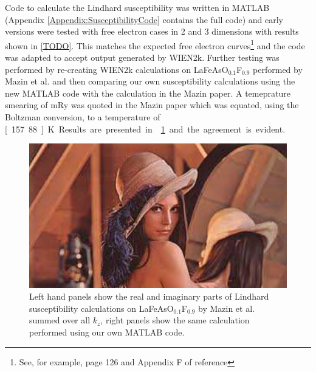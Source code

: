 Code to calculate the Lindhard susceptibility was written in MATLAB (Appendix \ref{Appendix:SusceptibilityCode} contains the full code) and early versions were tested with free electron cases in 2 and 3 dimensions with results shown in \ref{TODO}. This matches the expected free electron curves\footnote{See, for example, page 126 and Appendix F of reference\cite{Dressel2002}} and the code was adapted to accept output generated by WIEN2k. Further testing was performed by re-creating WIEN2k calculations on LaFeAsO$_{0.1}$F$_{0.9}$ performed by Mazin et al.\cite{Mazin2008} and then comparing our own susceptibility calculations using the new MATLAB code with the calculation in the Mazin paper. A temeprature smearing of \unit[1]{mRy} was quoted in the Mazin paper which was equated, using the Boltzman conversion, to a temperature of \unit[157.88]{K}. Results are presented in \fig\ref{Fig:3:MazinX0Comparison} and the agreement is evident.

\begin{figure}[htbp]
    \begin{center}
        \includegraphics[scale=0.9]{Misc/TODO}
        \caption{Left hand panels show the real and imaginary parts of Lindhard susceptibility calculations on LaFeAsO$_{0.1}$F$_{0.9}$ by Mazin et al. summed over all $k_z$, right panels show the same calculation performed using our own MATLAB code.}
        \label{Fig:3:MazinX0Comparison}
    \end{center}
\end{figure}

